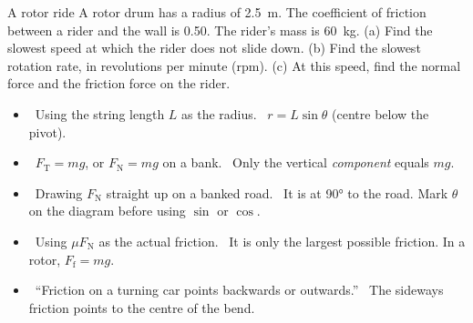 \begin{workedexample}{A rotor ride}\label{ch2:we:rotor}
A rotor drum has a radius of \qty{2.5}{m}. The coefficient of friction between a rider and
the wall is 0.50. The rider's mass is \qty{60}{kg}. (a) Find the slowest speed at which the
rider does not slide down. (b) Find the slowest rotation rate, in revolutions per minute
(rpm). (c) At this speed, find the normal force and the friction force on the rider.
\end{workedexample}


\begin{mistakes}
\begin{itemize}
  \item \xmark\ Using the string length $L$ as the radius. \cmark\ $r = L\sin\theta$ (centre
        below the pivot).
  \item \xmark\ $F_\mathrm{T} = mg$, or $F_\mathrm{N} = mg$ on a bank. \cmark\ Only the vertical
        \emph{component} equals $mg$.
  \item \xmark\ Drawing $F_\mathrm{N}$ straight up on a banked road. \cmark\ It is at \ang{90}
        to the road. Mark $\theta$ on the diagram before using $\sin$ or $\cos$.
  \item \xmark\ Using $\mu F_\mathrm{N}$ as the actual friction. \cmark\ It is only the largest
        possible friction. In a rotor, $F_\mathrm{f} = mg$.
  \item \xmark\ ``Friction on a turning car points backwards or outwards.'' \cmark\ The
        sideways friction points to the centre of the bend.
\end{itemize}
\end{mistakes}

